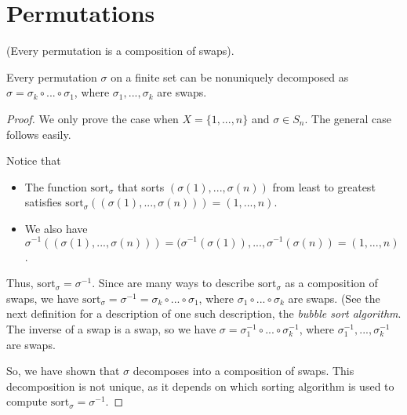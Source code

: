 \section*{Permutations}

\begin{theorem}
\label{ch::exterior_pwrs::thm::permutations_decompose_into_swaps}
    (Every permutation is a composition of swaps).

    Every permutation $\sigma$ on a finite set can be nonuniquely decomposed as $\sigma = \sigma_k \circ ... \circ \sigma_1$, where $\sigma_1, ..., \sigma_k$ are swaps.
\end{theorem}

\begin{proof}
    We only prove the case when $X = \{1, ..., n\}$ and $\sigma \in S_n$. The general case follows easily.
    
    Notice that
    
    \begin{itemize}
        \item The function $\text{sort}_\sigma$ that sorts $(\sigma(1), ..., \sigma(n))$ from least to greatest satisfies $\text{sort}_\sigma((\sigma(1), ..., \sigma(n))) = (1, ..., n)$.
        \item We also have $\sigma^{-1}((\sigma(1), ..., \sigma(n))) = (\sigma^{-1}(\sigma(1)), ..., \sigma^{-1}(\sigma(n)) = (1, ..., n)$.
    \end{itemize} 
    
    Thus, $\text{sort}_\sigma = \sigma^{-1}$. Since are many ways to describe $\text{sort}_\sigma$ as a composition of swaps, we have $\text{sort}_\sigma = \sigma^{-1} = \sigma_k \circ ... \circ \sigma_1$, where $\sigma_1 \circ ... \circ \sigma_k$ are swaps. (See the next definition for a description of one such description, the \textit{bubble sort algorithm}. The inverse of a swap is a swap, so we have $\sigma = \sigma_1^{-1} \circ ... \circ \sigma_k^{-1}$, where $\sigma_1^{-1}, ..., \sigma_k^{-1}$ are swaps. 
    
    So, we have shown that $\sigma$ decomposes into a composition of swaps. This decomposition is not unique, as it depends on which sorting algorithm is used to compute $\text{sort}_\sigma = \sigma^{-1}$.
    
\end{proof}

